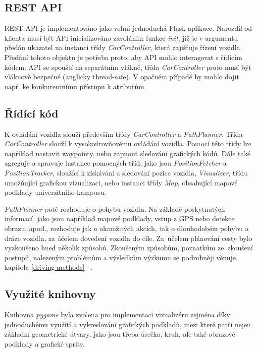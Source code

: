 \documentclass[czech, bachelor]{diploma}
\newcommand{\filipref}[1]{\ref{#1}\,--\,\nameref{#1}}
\begin{document}
\subsection{REST API}

REST API je implementováno jako velmi jednoduchá Flask aplikace. Narozdíl od klienta musí být API inicializováno zavoláním funkce
\emph{init}, jíž je v argumentu předán ukazatel na instanci třídy \emph{CarController}, která zajišťuje řízení vozidla. Předání
tohoto objektu je potřeba proto, aby API mohlo interagovat s řídícím kódem. API se spouští na separátním vlákně, třída
\emph{CarController} proto musí být vláknově bezpečné (anglicky thread-safe). V opačném případě by mohlo dojít např. ke 
konkurentnímu přístupu k atributům.

\subsection{Řídící kód}

K ovládání vozidla slouží především třídy \emph{CarController} a \emph{PathPlanner}. Třída \emph{CarController} slouží
k vysokoúrovňovému ovládání vozidla. Pomocí této třídy lze například nastavit waypointy, nebo zapnout sledování grafických kódů.
Dále také agreguje a spravuje instance pomocných tříd, jako jsou \emph{PositionFetcher} a \emph{PositionTracker}, sloužící
k získávání a sledování pozice vozidla, \emph{Visualizer}, třídu umožňující grafickou vizualizaci, nebo instanci třídy \emph{Map},
obsahující mapové podklady univerzitního kampusu.

\emph{PathPlanner} poté rozhoduje o pohybu vozidla. Na základě poskytnutých informací, jako jsou například mapové podklady, vstup
z GPS nebo detekce obrazu, apod., rozhoduje jak o okamžitých akcích, tak o dlouhodobém pohybu a dráze vozidla, za účelem dovedení
vozidla do cíle. Za~účelem plánování cesty bylo vyzkoušeno hned několik způsobů. Zkoušeným způsobům, poznatkům ze~zkoušení
postupů, nalezeným problémům a výsledkům výzkumu se podrobněji věnuje kapitola \filipref{driving-methods}.

\subsection{Využité knihovny}

Knihovna \emph{pygame} byla zvolena pro implementaci vizualizéru zejména díky jednoduchému využití a vykreslování grafických
podkladů, mezi které patří nejen základní geometrické útvary, jako jsou třeba úsečka, kruh, ale také obrazové podklady a grafické
sprity.
\end{document}
